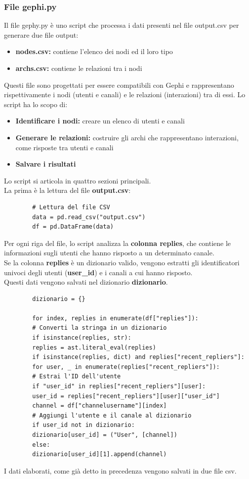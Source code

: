 \documentclass[12pt]{article}
\begin{document}
	\subsubsection{File gephi.py}
	Il file gephy.py è uno script che processa i dati presenti nel file output.csv per generare due file output:
	\begin{itemize}[label=]
		\item \textbf{nodes.csv:} contiene l'elenco dei nodi ed il loro tipo
		\item \textbf{archs.csv:} contiene le relazioni tra i nodi
	\end{itemize}
	Questi file sono progettati per essere compatibili con Gephi e rappresentano rispettivamente i nodi (utenti e canali) e le relazioni (interazioni) tra di essi.
	Lo script ha lo scopo di:
	\begin{itemize}[label=]
		\item \textbf{Identificare i nodi:} creare un elenco di utenti e canali
		\item \textbf{Generare le relazioni:} costruire gli archi che rappresentano interazioni, come risposte tra utenti e canali
		\item \textbf{Salvare i risultati}
	\end{itemize}
	Lo script si articola in quattro sezioni principali.\\
	La prima è la lettura del file \textbf{output.csv}:
	\begin{lstlisting}
		# Lettura del file CSV
		data = pd.read_csv("output.csv")
		df = pd.DataFrame(data)
	\end{lstlisting}
	Per ogni riga del file, lo script analizza la \textbf{colonna replies}, che contiene le informazioni sugli utenti che hanno risposto a un determinato canale.\\
	Se la colonna \textbf{replies} è un dizionario valido, vengono estratti gli identificatori univoci degli utenti (\textbf{user\_id}) e i canali a cui hanno risposto.\\
	Questi dati vengono salvati nel dizionario \textbf{dizionario}.
	\begin{lstlisting}
		dizionario = {}
		
		for index, replies in enumerate(df["replies"]):
		# Converti la stringa in un dizionario
		if isinstance(replies, str):
		replies = ast.literal_eval(replies)
		if isinstance(replies, dict) and replies["recent_repliers"]:
		for user, _ in enumerate(replies["recent_repliers"]):
		# Estrai l'ID dell'utente
		if "user_id" in replies["recent_repliers"][user]:
		user_id = replies["recent_repliers"][user]["user_id"]
		channel = df["channelusername"][index]
		# Aggiungi l'utente e il canale al dizionario
		if user_id not in dizionario:
		dizionario[user_id] = ("User", [channel])
		else:
		dizionario[user_id][1].append(channel)
	\end{lstlisting}
	I dati elaborati, come già detto in precedenza vengono salvati in due file csv.
\end{document}
